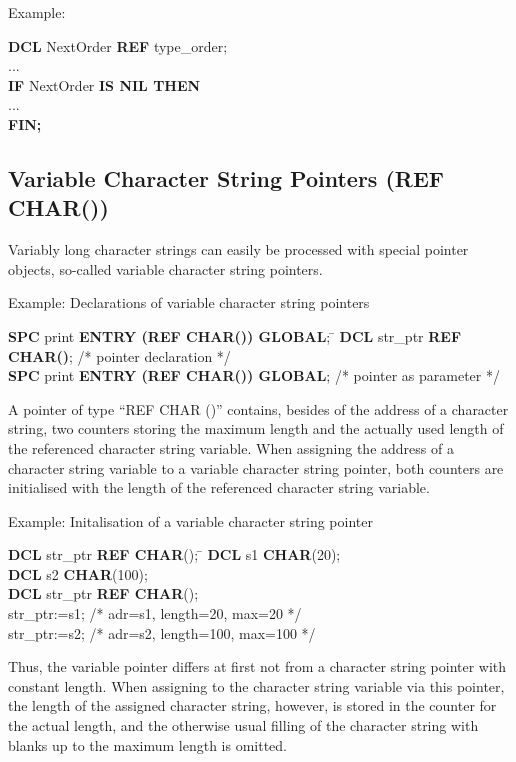 Example:

{\bf DCL} NextOrder {\bf REF} type\_order;\\
...\\
{\bf IF} NextOrder {\bf IS NIL THEN}\\
\x ...\\
{\bf FIN;}

\subsection{Variable Character String Pointers (REF CHAR())}  %
\label{sec_ref_char}

Variably long character strings can easily be processed with special
pointer objects, so-called variable character string pointers.

Example: Declarations of variable character string pointers

\begin{tabbing}
{\bf SPC} print {\bf ENTRY (REF CHAR()) GLOBAL}; \=  \kill
{\bf DCL} str\_ptr {\bf REF CHAR()}; \> /* pointer declaration */       \\
{\bf SPC} print {\bf ENTRY (REF CHAR()) GLOBAL}; \>  /* pointer as parameter */
\end{tabbing}

A pointer of type ``REF CHAR ()'' contains, besides of the address of a
character string, two counters storing the maximum length and the
actually used length of the referenced character string variable. When
assigning the address of a character string variable to a variable
character string pointer, both counters are initialised with the length
of the referenced character string variable.

Example: Initalisation of a variable character string pointer

\begin{tabbing}
{\bf DCL} str\_ptr \= {\bf REF CHAR}(); \= \kill
{\bf DCL} s1 \> {\bf CHAR}(20); \> \\
{\bf DCL} s2 \> {\bf CHAR}(100); \> \\
{\bf DCL} str\_ptr \> {\bf REF CHAR}(); \> \\
str\_ptr:=s1; \> \> /* adr=s1, length=20, max=20 */ \\
str\_ptr:=s2; \> \> /* adr=s2, length=100, max=100 */
\end{tabbing}

Thus, the variable pointer differs at first not from a character string
pointer with constant length. When assigning to the character string
variable via this pointer, the length of the assigned character string,
however, is stored in the counter for the actual length, and the
otherwise usual filling of the character string with blanks up to the
maximum length is omitted.

